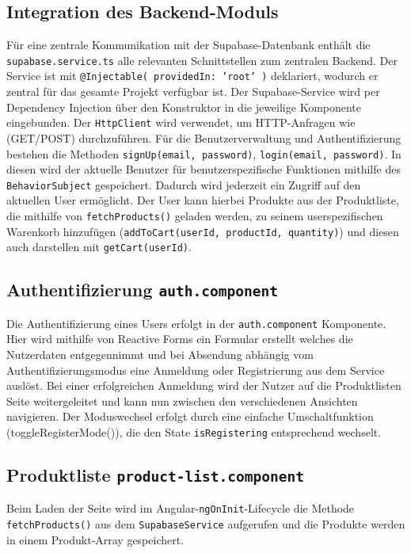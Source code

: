 \documentclass[oneside]{ausarbeitung}
\begin{document}
\subsection{Integration des Backend-Moduls}

Für eine zentrale Kommunikation mit der Supabase-Datenbank enthält die \texttt{supabase.service.ts} alle relevanten Schnittstellen zum zentralen Backend.
Der Service ist mit \texttt{@Injectable({ providedIn: 'root' })} deklariert, wodurch er zentral für das gesamte Projekt verfügbar ist. Der Supabase-Service wird per Dependency Injection über den Konstruktor in die jeweilige Komponente eingebunden. Der \texttt{HttpClient} wird verwendet, um HTTP-Anfragen wie (GET/POST) durchzuführen. Für die Benutzerverwaltung und Authentifizierung bestehen die Methoden \texttt{signUp(email, password)}, \texttt{login(email, password)}. In diesen wird der aktuelle Benutzer für benutzerspezifische Funktionen mithilfe des \texttt{BehaviorSubject} gespeichert. Dadurch wird jederzeit ein Zugriff auf den aktuellen User ermöglicht. Der User kann hierbei Produkte aus der Produktliste, die mithilfe von \texttt{fetchProducts()} geladen werden, zu seinem userspezifischen Warenkorb hinzufügen (\texttt{addToCart(userId, productId, quantity)}) und diesen auch darstellen mit \texttt{getCart(userId)}.

\subsection{Authentifizierung \texttt{auth.component}}

Die Authentifizierung eines Users erfolgt in der \texttt{auth.component} Komponente. Hier wird mithilfe von Reactive Forms ein Formular erstellt welches die Nutzerdaten entgegennimmt und bei Absendung abhängig vom Authentifizierungsmodus eine Anmeldung oder Registrierung aus dem Service auslöst. Bei einer erfolgreichen Anmeldung wird der Nutzer auf die Produktlisten Seite weitergeleitet und kann nun zwischen den verschiedenen Ansichten navigieren. Der Moduswechsel erfolgt durch eine einfache Umschaltfunktion (toggleRegisterMode()), die den State \texttt{isRegistering} entsprechend wechselt.

\subsection{Produktliste \texttt{product-list.component}}

Beim Laden der Seite wird im Angular-\texttt{ngOnInit}-Lifecycle die Methode \texttt{fetchProducts()} aus dem \texttt{SupabaseService} aufgerufen und die Produkte werden in einem Produkt-Array gespeichert.
\end{document}
